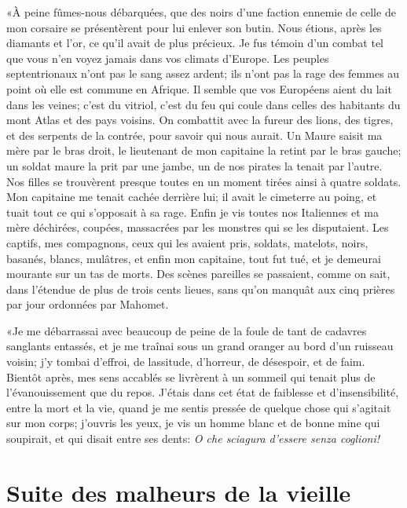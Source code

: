 «À peine fûmes-nous débarquées, que des noirs d’une faction ennemie de
celle de mon corsaire se présentèrent pour lui enlever son butin. Nous
étions, après les diamants et l’or, ce qu’il avait de plus précieux. Je
fus témoin d’un combat tel que vous n’en voyez jamais dans vos climats
d’Europe. Les peuples septentrionaux n’ont pas le sang assez ardent;
ils n’ont pas la rage des femmes au point où elle est commune en
Afrique. Il semble que vos Européens aient du lait dans les veines;
c’est du vitriol, c’est du feu qui coule dans celles des habitants du
mont Atlas et des pays voisins. On combattit avec la fureur des lions,
des tigres, et des serpents de la contrée, pour savoir qui nous aurait.
Un Maure saisit ma mère par le bras droit, le lieutenant de mon
capitaine la retint par le bras gauche; un soldat maure la prit par une
jambe, un de nos pirates la tenait par l’autre. Nos filles se
trouvèrent presque toutes en un moment tirées ainsi à quatre soldats.
Mon capitaine me tenait cachée derrière lui; il avait le cimeterre au
poing, et tuait tout ce qui s’opposait à sa rage. Enfin je vis toutes
nos Italiennes et ma mère déchirées, coupées, massacrées par les
monstres qui se les disputaient. Les captifs, mes compagnons, ceux qui
les avaient pris, soldats, matelots, noirs, basanés, blancs, mulâtres,
et enfin mon capitaine, tout fut tué, et je demeurai mourante sur un
tas de morts. Des scènes pareilles se passaient, comme on sait, dans
l’étendue de plus de trois cents lieues, sans qu’on manquât aux cinq
prières par jour ordonnées par Mahomet.

«Je me débarrassai avec beaucoup de peine de la foule de tant de
cadavres sanglants entassés, et je me traînai sous un grand oranger au
bord d’un ruisseau voisin; j’y tombai d’effroi, de lassitude,
d’horreur, de désespoir, et de faim. Bientôt après, mes sens accablés se
livrèrent à un sommeil qui tenait plus de l’évanouissement que du
repos. J’étais dans cet état de faiblesse et d’insensibilité, entre la
mort et la vie, quand je me sentis pressée de quelque chose qui
s’agitait sur mon corps; j’ouvris les yeux, je vis un homme blanc et de
bonne mine qui soupirait, et qui disait entre ses dents: \emph{O che
sciagura d’essere senza coglioni!}




\chapter{Suite des malheurs de la vieille}


